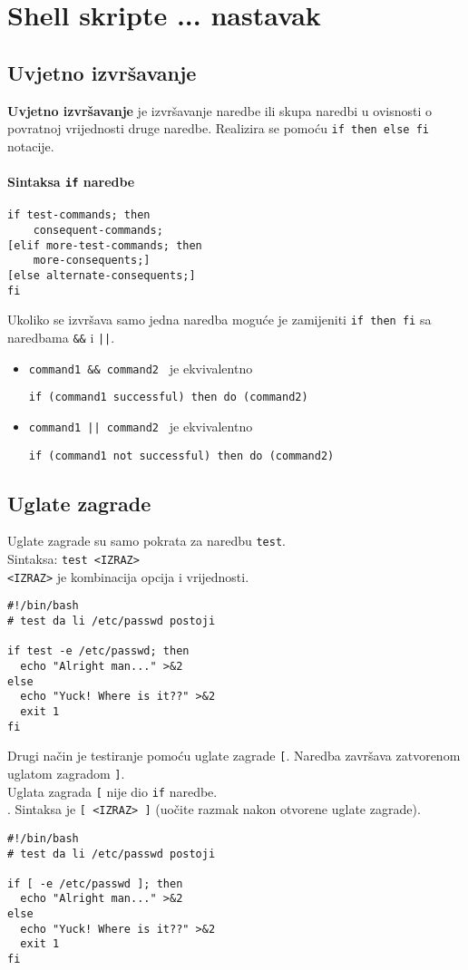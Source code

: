 \section{Shell skripte ... nastavak}

\subsection*{Uvjetno izvršavanje}
\textbf{Uvjetno izvršavanje} je izvršavanje naredbe ili skupa naredbi u ovisnosti o povratnoj vrijednosti druge naredbe. Realizira se pomoću \texttt{if then else fi} notacije.

\paragraph{Sintaksa \texttt{if} naredbe}
\begin{lstlisting}
if test-commands; then
    consequent-commands;
[elif more-test-commands; then
    more-consequents;]
[else alternate-consequents;]
fi
\end{lstlisting}

Ukoliko se izvršava samo jedna naredba moguće je zamijeniti \texttt{if then fi} sa naredbama \texttt{\&\&} i \texttt{||}.
\begin{itemize}
 \item 
\lstinline!command1 && command2 ! je ekvivalentno 

\lstinline!if (command1 successful) then do (command2)!

\item \lstinline!command1 || command2 ! je ekvivalentno 

\lstinline!if (command1 not successful) then do (command2)!

\end{itemize}


\subsection*{Uglate zagrade}
Uglate zagrade su samo pokrata za naredbu \texttt{test}. 
\\
Sintaksa: \texttt{test <IZRAZ>}
\\
\texttt{<IZRAZ>} je kombinacija opcija i vrijednosti.
\begin{lstlisting}
#!/bin/bash
# test da li /etc/passwd postoji

if test -e /etc/passwd; then
  echo "Alright man..." >&2
else
  echo "Yuck! Where is it??" >&2
  exit 1
fi
\end{lstlisting}
Drugi način je testiranje pomoću uglate zagrade \texttt{[}. Naredba završava zatvorenom uglatom zagradom \texttt{]}. \\
Uglata zagrada \texttt{[} nije dio \texttt{if} naredbe.\\.
Sintaksa je \texttt{[ <IZRAZ> ]} (uočite razmak nakon otvorene uglate zagrade).
\begin{lstlisting}
#!/bin/bash
# test da li /etc/passwd postoji

if [ -e /etc/passwd ]; then
  echo "Alright man..." >&2
else
  echo "Yuck! Where is it??" >&2
  exit 1
fi
\end{lstlisting}

